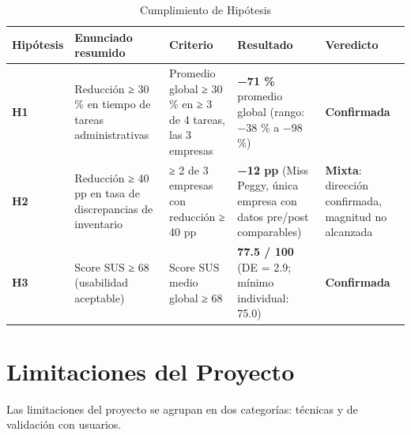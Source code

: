 \begin{longtable}[]{@{}
  >{\raggedright\arraybackslash}p{}
  >{\raggedright\arraybackslash}p{}
  >{\raggedright\arraybackslash}p{}
  >{\raggedright\arraybackslash}p{}
  >{\raggedright\arraybackslash}p{}@{}}
\caption[Cumplimiento de Hipótesis]{Cumplimiento de Hipótesis}\tabularnewline
\toprule\noalign{}
\begin{minipage}[b]{\linewidth}\raggedright
Hipótesis
\end{minipage} & \begin{minipage}[b]{\linewidth}\raggedright
Enunciado resumido
\end{minipage} & \begin{minipage}[b]{\linewidth}\raggedright
Criterio
\end{minipage} & \begin{minipage}[b]{\linewidth}\raggedright
Resultado
\end{minipage} & \begin{minipage}[b]{\linewidth}\raggedright
Veredicto
\end{minipage} \\
\midrule\noalign{}
\endhead
\bottomrule\noalign{}
\endlastfoot
\textbf{H1} & Reducción ≥ 30 \% en tiempo de tareas administrativas & Promedio global ≥ 30 \% en ≥ 3 de 4 tareas, las 3 empresas & \textbf{−71 \%} promedio global (rango: −38 \% a −98 \%) & \textbf{Confirmada} \\
\textbf{H2} & Reducción ≥ 40 pp en tasa de discrepancias de inventario & ≥ 2 de 3 empresas con reducción ≥ 40 pp & \textbf{−12 pp} (Miss Peggy, única empresa con datos pre/post comparables) & \textbf{Mixta}: dirección confirmada, magnitud no alcanzada \\
\textbf{H3} & Score SUS ≥ 68 (usabilidad aceptable) & Score SUS medio global ≥ 68 & \textbf{77.5 / 100} (DE = 2.9; mínimo individual: 75.0) & \textbf{Confirmada} \\
\end{longtable}

\section{Limitaciones del Proyecto}\label{limitaciones-del-proyecto}

Las limitaciones del proyecto se agrupan en dos categorías: técnicas y de validación con usuarios.

